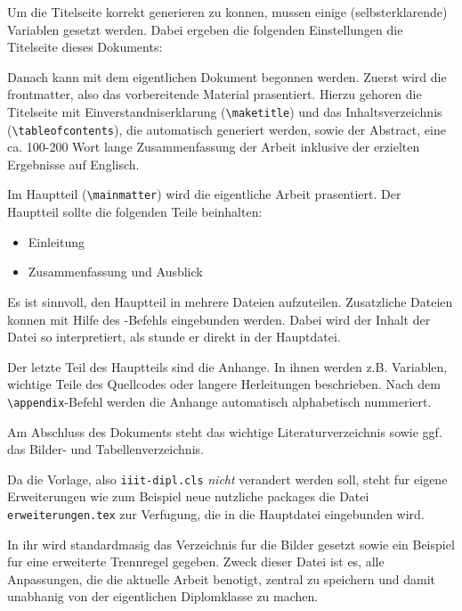 Um die Titelseite korrekt generieren zu konnen, mussen einige (selbsterklarende) Variablen gesetzt
werden. Dabei ergeben die folgenden Einstellungen die Titelseite dieses Dokuments:

Danach kann mit dem eigentlichen Dokument begonnen werden. Zuerst wird die frontmatter, also das
vorbereitende Material prasentiert. Hierzu gehoren die Titelseite mit Einverstandniserklarung
(\lstinline!\maketitle!) und das Inhaltsverzeichnis (\lstinline!\tableofcontents!), die automatisch
generiert werden, sowie der Abstract, eine ca. 100-200 Wort lange Zusammenfassung der Arbeit
inklusive der erzielten Ergebnisse auf Englisch.

Im Hauptteil (\lstinline!\mainmatter!) wird die eigentliche Arbeit prasentiert. Der Hauptteil
sollte die folgenden Teile beinhalten:
\begin{itemize}
      \item
            Einleitung
      \item
            Zusammenfassung und Ausblick
\end{itemize}
Es ist sinnvoll, den Hauptteil in mehrere Dateien aufzuteilen. Zusatzliche Dateien konnen mit Hilfe des
\lstinline!!-Befehls eingebunden werden. Dabei wird der Inhalt der Datei so interpretiert, als
stunde er direkt in der Hauptdatei.

Der letzte Teil des Hauptteils sind die Anhange. In ihnen werden z.B. Variablen, wichtige Teile des
Quellcodes oder langere Herleitungen beschrieben. Nach dem \lstinline!\appendix!-Befehl werden die
Anhange automatisch alphabetisch nummeriert.

Am Abschluss des Dokuments steht das wichtige Literaturverzeichnis sowie ggf. das Bilder- und
Tabellenverzeichnis.



Da die Vorlage, also \lstinline!iiit-dipl.cls! \textit{nicht} verandert werden soll, steht fur
eigene Erweiterungen wie zum Beispiel neue nutzliche packages die Datei
\lstinline!erweiterungen.tex! zur Verfugung, die in die Hauptdatei eingebunden wird.

In ihr wird standardmasig das Verzeichnis fur die Bilder gesetzt sowie ein Beispiel fur eine
erweiterte Trennregel gegeben. Zweck dieser Datei ist es, alle Anpassungen, die die aktuelle Arbeit
benotigt, zentral zu speichern und damit unabhanig von der eigentlichen Diplomklasse zu machen.

